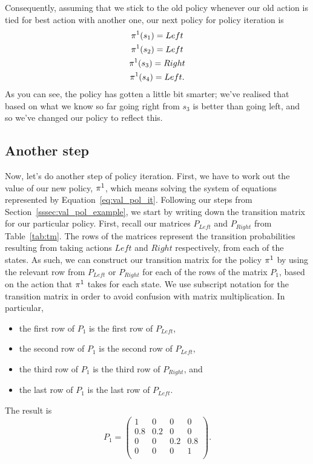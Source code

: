 \documentclass[a4paper]{article}
\begin{document}
Consequently, assuming that we stick to the old policy whenever our
old action is tied for best action with another one,
our next policy for policy iteration is
\begin{gather*}
  \pi^1(s_1) = Left \\
  \pi^1(s_2) = Left \\
  \pi^1(s_3) = Right \\
  \pi^1(s_4) = Left .
\end{gather*}
As you can see, the policy has gotten a little bit smarter;
we've realised that based on what we know so far
going right from $s_3$ is better than going left,
and so we've changed our policy to reflect this.

\subsection{Another step}
Now, let's do another step of policy iteration.
First, we have to work out the value of our new policy, $\pi^1$,
which means solving the system of equations represented by
Equation~\ref{eq:val_pol_it}.
Following our steps from Section~\ref{sssec:val_pol_example},
we start by writing down the transition matrix for our particular
policy.
First, recall our matrices $P_{Left}$ and $P_{Right}$ from
Table~\ref{tab:tm}.
The rows of the matrices represent the transition probabilities
resulting from taking actions $Left$ and $Right$ respectively,
from each of the states.
As such, we can construct our transition matrix for the policy
$\pi^1$ by using the relevant row from $P_{Left}$ or $P_{Right}$
for each of the rows of the matrix $P_1$,
based on the action that $\pi^1$ takes for each state.
We use subscript notation for the transition matrix in order
to avoid confusion with matrix multiplication.
In particular,
\begin{itemize}
  \item the first row of $P_1$ is the first row of $P_{Left}$,
  \item the second row of $P_1$ is the second row of $P_{Left}$,
  \item the third row of $P_1$ is the third row of $P_{Right}$, and
  \item the last row of $P_1$ is the last row of $P_{Left}$.
\end{itemize}
The result is
\begin{equation*}
  P_1 =
  \begin{pmatrix}
      1   & 0   & 0   & 0   \\
      0.8 & 0.2 & 0   & 0   \\
      0   & 0   & 0.2 & 0.8 \\
      0   & 0   & 0   & 1   \\
  \end{pmatrix} .
\end{equation*}
\end{document}
